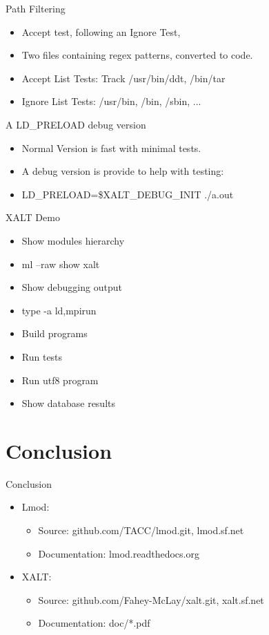 \documentclass{beamer}
\begin{document}
\begin{frame}{Path Filtering}
  \begin{itemize}
    \item Accept test, following an Ignore Test,
    \item Two files containing regex patterns, converted to code.
    \item Accept List Tests: Track /usr/bin/ddt, /bin/tar
    \item Ignore List Tests: /usr/bin, /bin, /sbin, ...
  \end{itemize}
\end{frame}

\begin{frame}{A LD\_PRELOAD debug version}
  \begin{itemize}
    \item Normal Version is fast with minimal tests.
    \item A debug version is provide to help with testing:
    \item LD\_PRELOAD=\$XALT\_DEBUG\_INIT ./a.out
  \end{itemize}
\end{frame}

\begin{frame}{XALT Demo}
  \begin{itemize}
    \item Show modules hierarchy
    \item ml --raw show xalt
    \item Show debugging output
    \item type -a {ld,mpirun}
    \item Build programs
    \item Run tests
    \item Run utf8 program
    \item Show database results
  \end{itemize}
\end{frame}


\section{Conclusion}
\begin{frame}{Conclusion}
  \begin{itemize}
    \item Lmod:
      \begin{itemize}
        \item Source: github.com/TACC/lmod.git, lmod.sf.net
        \item Documentation: lmod.readthedocs.org
      \end{itemize}
    \item XALT:
      \begin{itemize}
        \item Source: github.com/Fahey-McLay/xalt.git, xalt.sf.net
        \item Documentation: doc/*.pdf
      \end{itemize}
  \end{itemize}
\end{frame}
\end{document}
